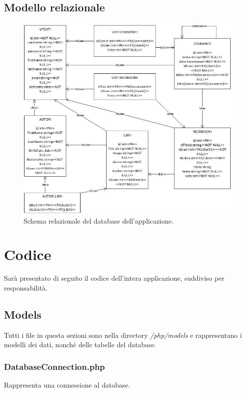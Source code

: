 \documentclass[italian]{article}
\begin{document}
\subsection{Modello relazionale}
\begin{figure}[h]
	\centering
	\includegraphics[width=1\linewidth]{images/schema_relazionale}
	\caption[Schema relazionale]{Schema relazionale del database dell'applicazione.}
	\label{fig:schemarelazionale}
\end{figure}
\pagebreak
\section{Codice}
Sarà presentato di seguito il codice dell'intera applicazione, suddiviso per responsabilità.


\subsection{Models}
Tutti i file in questa sezioni sono nella directory \textit{/php/models} e rappresentano i modelli dei dati, nonché delle tabelle del database.

\subsubsection{DatabaseConnection.php}
Rappresenta una connessione al database.

\end{document}
